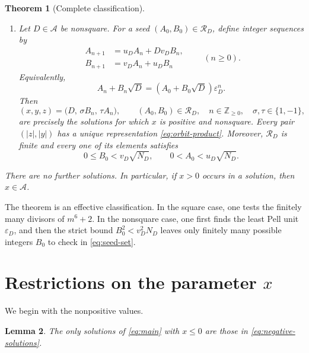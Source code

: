 \documentclass[a4paper,11pt]{amsart}
\numberwithin{equation}{section}
\newtheorem{theorem}{Theorem}[section]
\newtheorem{lemma}[theorem]{Lemma}
\theoremstyle{definition}
\theoremstyle{remark}
\newcommand{\Z}{\mathbb Z}
\newcommand{\eps}{\varepsilon}
\newcommand{\Acal}{\mathcal A}
\newcommand{\Rcal}{\mathcal R}
\begin{document}
\begin{theorem}[Complete classification]
\begin{enumerate}[label=\textup{(\roman*)},leftmargin=2.2em]
\item Let \(D\in\Acal\) be nonsquare.  For a seed
\((A_0,B_0)\in\Rcal_D\), define integer sequences by
\begin{equation}\label{eq:pell-recurrence}
 \begin{aligned}
 A_{n+1}&=u_DA_n+Dv_DB_n,\\
 B_{n+1}&=v_DA_n+u_DB_n
 \end{aligned}
 \qquad(n\geq0).
\end{equation}
Equivalently,
\begin{equation}\label{eq:orbit-product}
 A_n+B_n\sqrt D=(A_0+B_0\sqrt D)\eps_D^n.
\end{equation}
Then
\begin{equation}\label{eq:nonsquare-solutions}
 (x,y,z)=\bigl(D,\,\sigma B_n,\,\tau A_n\bigr),
 \qquad
 (A_0,B_0)\in\Rcal_D,
 \quad n\in\Z_{\geq0},
 \quad \sigma,\tau\in\{1,-1\},
\end{equation}
are precisely the solutions for which \(x\) is positive and nonsquare.
Every pair \((|z|,|y|)\) has a unique representation
\eqref{eq:orbit-product}.  Moreover, \(\Rcal_D\) is finite and every one of
its elements satisfies
\begin{equation}\label{eq:seed-bounds}
 0\leq B_0<v_D\sqrt{N_D},
 \qquad
 0<A_0<u_D\sqrt{N_D}.
\end{equation}
\end{enumerate}

There are no further solutions.  In particular, if \(x>0\) occurs in a
solution, then \(x\in\Acal\).
\end{theorem}

The theorem is an effective classification.  In the square case, one tests
the finitely many divisors of \(m^6+2\).  In the nonsquare case, one first
finds the least Pell unit \(\eps_D\), and then the strict bound
\(B_0^2<v_D^2N_D\) leaves only finitely many possible integers \(B_0\) to
check in \eqref{eq:seed-set}.

\section{Restrictions on the parameter \texorpdfstring{$x$}{x}}

We begin with the nonpositive values.

\begin{lemma}\label{lem:nonpositive}
The only solutions of \eqref{eq:main} with \(x\leq0\) are those in
\eqref{eq:negative-solutions}.
\end{lemma}
\end{document}

